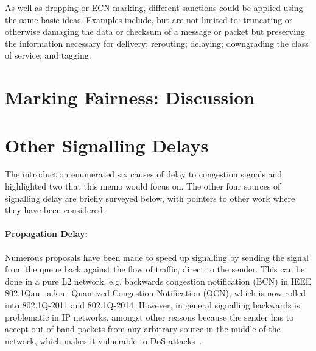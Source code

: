 As well as dropping or ECN-marking, different sanctions could be applied using the same basic ideas. Examples include, but are not limited to: truncating or otherwise damaging the data or checksum of a message or packet but preserving the information necessary for delivery; rerouting; delaying; downgrading the class of service; and tagging.

\section{Marking Fairness: Discussion}\label{sec:marking_fairness_discuss}







\section{Other Signalling Delays}\label{sec:other_delays}

The introduction enumerated six causes of delay to congestion signals and highlighted two that this memo would focus on. The other four sources of signalling delay are briefly surveyed below, with pointers to other work where they have been considered.

\paragraph{Propagation Delay:} Numerous proposals have been made to speed up signalling by sending the signal from the queue back against the flow of traffic, direct to the sender. This can be done in a pure L2 network, e.g. backwards congestion notification (BCN) in IEEE 802.1Qau~\cite{IEEE802.1Qau:Ethernet_QCN} a.k.a.\ Quantized Congestion Notification (QCN), which is now rolled into 802.1Q-2011 and 802.1Q-2014. However, in general signalling backwards is problematic in IP networks, amongst other reasons because the sender has to accept out-of-band packets from any arbitrary source in the middle of the network, which makes it vulnerable to DoS attacks~\cite{IETF_RFC6633:ICMP_SQ_Depr}. 

